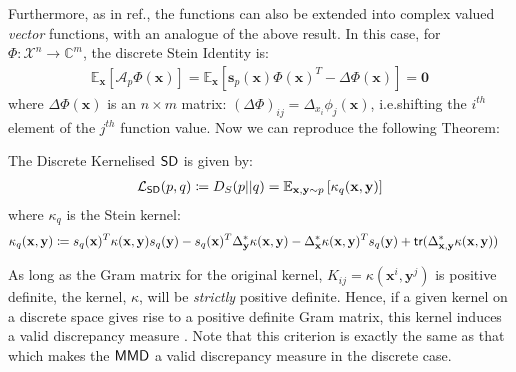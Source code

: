 Furthermore, as in ref., the functions can also be extended into complex valued \textit{vector} functions, with an analogue of the above result. In this case, for $\Phi: \mathcal{X}^n \rightarrow \mathbb{C}^m$, the discrete Stein Identity is:
\begin{align}
    \mathbb{E}_{\mathbf{x}}\left[\mathcal{A}_p\Phi(\mathbf{x})\right] = \mathbb{E}_{\mathbf{x}}\left[\mathbf{s}_p(\mathbf{x})\Phi(\mathbf{x})^T - \Delta\Phi(\mathbf{x})\right] = \mathbf{0} \label{vectordiscretesteinidentity}
\end{align}
where $\Delta\Phi(\mathbf{x})$ is an $n\times m$ matrix: $(\Delta\Phi)_{ij} = \Delta_{x_i}\phi_j(\mathbf{x})$, i.e.\@ shifting the $i^{th}$ element of the $j^{th}$ function value. Now we can reproduce the following Theorem:
\begin{theorem}\label{thm:yangkerneldiscretestein}
The Discrete Kernelised $\operatorname{\textsf{SD}}$ is given by:
\begin{align}
    \mathcal{L}_{\operatorname{\textsf{SD}}}(p, q)  \coloneqq D_S(p||q) = \mathbb{E}_{\mathbf{x}, \mathbf{y}\sim p}\left[\kappa_q(\mathbf{x}, \mathbf{y})\right] \label{steindiscrepancycost}
\end{align}
where $\kappa_q$ is the Stein kernel:
\begin{align}
    \kappa_q(\mathbf{x}, \mathbf{y}) &  \coloneqq s_q(\mathbf{x})^T\kappa(\mathbf{x}, \mathbf{y})s_q(\mathbf{y}) -s_q(\mathbf{x})^T\Delta_{\mathbf{y}}^*\kappa(\mathbf{x}, \mathbf{y})  - \Delta_{\mathbf{x}}^*\kappa(\mathbf{x}, \mathbf{y})^Ts_q(\mathbf{y}) + \textsf{tr}(\Delta_{\mathbf{x}, \mathbf{y}}^*\kappa(\mathbf{x}, \mathbf{y}))
\end{align}
\end{theorem}

As long as the Gram matrix for the original kernel, $K_{ij} = \kappa(\mathbf{x}^i, \mathbf{y}^j)$ is positive definite, the kernel, $\kappa$, will be \textit{strictly} positive definite. Hence, if a given kernel on a discrete space gives rise to a positive definite Gram matrix, this kernel induces a valid discrepancy measure . Note that this criterion is exactly the same as that which makes the $\operatorname{\textsf{MMD}}$ a valid discrepancy measure in the discrete case.  


